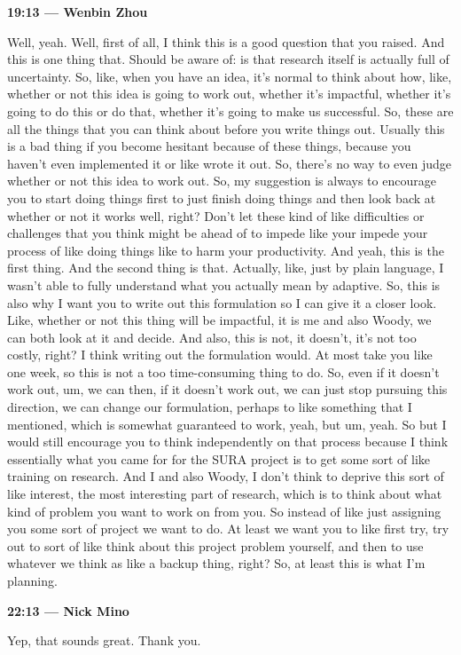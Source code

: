 \documentclass[11pt]{article}
\newcommand{\Turn}[2]{%
  \medskip\noindent\textbf{#1 --- #2}\par\nobreak\noindent\ignorespaces
}
\begin{document}
\Turn{19:13}{Wenbin Zhou}
Well, yeah. Well, first of all, I think this is a good question that you
raised. And this is one thing that. Should be aware of: is that research itself
is actually full of uncertainty. So, like, when you have an idea, it's normal
to think about how, like, whether or not this idea is going to work out,
whether it's impactful, whether it's going to do this or do that, whether it's
going to make us successful. So, these are all the things that you can think
about before you write things out. Usually this is a bad thing if you become
hesitant because of these things, because you haven't even implemented it or
like wrote it out. So, there's no way to even judge whether or not this idea to
work out. So, my suggestion is always to encourage you to start doing things
first to just finish doing things and then look back at whether or not it works
well, right? Don't let these kind of like difficulties or challenges that you
think might be ahead of to impede like your impede your process of like doing
things like to harm your productivity. And yeah, this is the first thing. And
the second thing is that. Actually, like, just by plain language, I wasn't able
to fully understand what you actually mean by adaptive. So, this is also why I
want you to write out this formulation so I can give it a closer look. Like,
whether or not this thing will be impactful, it is me and also Woody, we can
both look at it and decide. And also, this is not, it doesn't, it's not too
costly, right? I think writing out the formulation would. At most take you like
one week, so this is not a too time-consuming thing to do. So, even if it
doesn't work out, um, we can then, if it doesn't work out, we can just stop
pursuing this direction, we can change our formulation, perhaps to like
something that I mentioned, which is somewhat guaranteed to work, yeah, but um,
yeah. So but I would still encourage you to think independently on that process
because I think essentially what you came for for the SURA project is to get
some sort of like training on research. And I and also Woody, I don't think to
deprive this sort of like interest, the most interesting part of research,
which is to think about what kind of problem you want to work on from you. So
instead of like just assigning you some sort of project we want to do. At least
we want you to like first try, try out to sort of like think about this project
problem yourself, and then to use whatever we think as like a backup thing,
right? So, at least this is what I'm planning.

\Turn{22:13}{Nick Mino}
Yep, that sounds great. Thank you.
\end{document}
